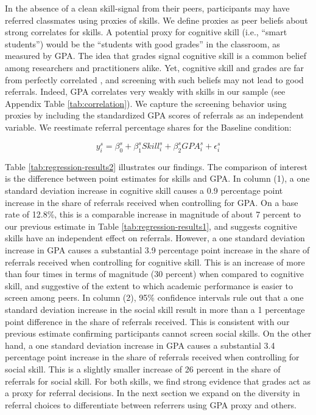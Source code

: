 \documentclass[11pt,a4paper,oneside]{article}
\begin{document}
In the absence of a clean skill-signal from their peers, participants may have referred classmates using proxies of skills. We define proxies as peer beliefs about strong correlates for skills. A potential proxy for cognitive skill (i.e., ``smart students'') would be the ``students with good grades'' in the classroom, as measured by GPA. The idea that grades signal cognitive skill is a common belief among researchers and practitioners alike. Yet, cognitive skill and grades are far from perfectly correlated \citep{heckman2006effects,heckman2012hard}, and screening with such beliefs may not lead to  good referrals. Indeed, GPA correlates very weakly with skills in our sample (see Appendix Table \ref{tab:correlation}). We capture the screening behavior using proxies by including the standardized GPA scores of referrals as an independent variable. We reestimate referral percentage shares for the Baseline condition: 

\begin{equation}\label{skill_gpa}
  y_{i}^{s} = \beta_{0}^{s} + \beta_{1}^{s}{Skill}_{i}^{s} + \beta_{2}^{s}{GPA}_{i}^{s} + \epsilon_{i}^{s}    
\end{equation} 

Table \ref{tab:regression-results2} illustrates our findings. The comparison of interest is the difference between point estimates for skills and GPA. In column (1), a one standard deviation increase in cognitive skill causes a 0.9 percentage point increase in the share of referrals received when controlling for GPA. On a base rate of 12.8\%, this is a comparable increase in magnitude of about 7 percent to our previous estimate in Table \ref{tab:regression-results1}, and suggests cognitive skills have an independent effect on referrals. However, a one standard deviation increase in GPA causes a substantial 3.9 percentage point increase in the share of referrals received when controlling for cognitive skill. This is an increase of more than four times in terms of magnitude (30 percent) when compared to cognitive skill, and suggestive of the extent to which academic performance is easier to screen among peers. In column (2), 95\% confidence intervals rule out that a one standard deviation increase in the social skill result in more than a 1 percentage point difference in the share of referrals received. This is consistent with our previous estimate confirming participants cannot screen social skills. On the other hand, a one standard deviation increase in GPA causes a substantial 3.4 percentage point increase in the share of referrals received when controlling for social skill. This is a slightly smaller increase of 26 percent in the share of referrals for social skill. For both skills, we find strong evidence that grades act as a proxy for referral decisions. In the next section we expand on the diversity in referral choices to differentiate between referrers using GPA proxy and others.
\end{document}

